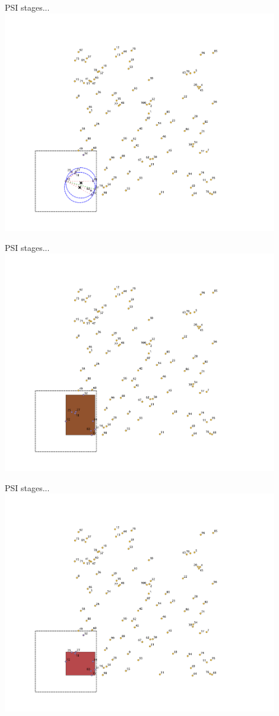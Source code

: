 \documentclass{beamer}
\begin{document}
\begin{frame}{PSI stages...}
    \centering
    \includegraphics[trim={0cm 0cm 0cm 1.5cm}, clip, width=0.9\textwidth]{figures/psi2/p09}
\end{frame}
\begin{frame}{PSI stages...}
    \centering
    \includegraphics[trim={0cm 0cm 0cm 1.5cm}, clip, width=0.9\textwidth]{figures/psi2/p10}
\end{frame}
\begin{frame}{PSI stages...}
    \centering
    \includegraphics[trim={0cm 0cm 0cm 1.5cm}, clip, width=0.9\textwidth]{figures/psi2/p11}
\end{frame}
\end{document}
